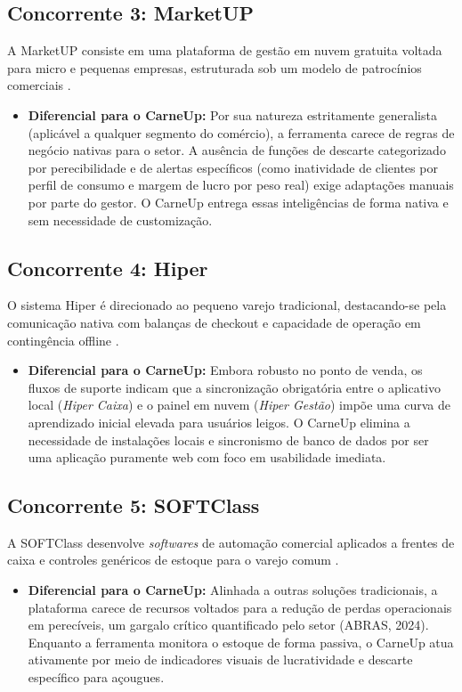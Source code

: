 \documentclass[
	12pt,				%
	openany,			%
	oneside,			%
	a4paper,			%
	english,			%
	french,				%
	spanish,			%
	brazil				%
	]{abntex2}
\begin{document}
\subsection{Concorrente 3: MarketUP}
A MarketUP consiste em uma plataforma de gestão em nuvem gratuita voltada para micro e pequenas empresas, estruturada sob um modelo de patrocínios comerciais \cite{marketUp}.
\begin{itemize}
    \item \textbf{Diferencial para o CarneUp:} Por sua natureza estritamente generalista (aplicável a qualquer segmento do comércio), a ferramenta carece de regras de negócio nativas para o setor. A ausência de funções de descarte categorizado por perecibilidade e de alertas específicos (como inatividade de clientes por perfil de consumo e margem de lucro por peso real) exige adaptações manuais por parte do gestor. O CarneUp entrega essas inteligências de forma nativa e sem necessidade de customização.
\end{itemize}

\subsection{Concorrente 4: Hiper}
O sistema Hiper é direcionado ao pequeno varejo tradicional, destacando-se pela comunicação nativa com balanças de checkout e capacidade de operação em contingência offline \cite{hiper}.
\begin{itemize}
    \item \textbf{Diferencial para o CarneUp:} Embora robusto no ponto de venda, os fluxos de suporte indicam que a sincronização obrigatória entre o aplicativo local (\textit{Hiper Caixa}) e o painel em nuvem (\textit{Hiper Gestão}) impõe uma curva de aprendizado inicial elevada para usuários leigos. O CarneUp elimina a necessidade de instalações locais e sincronismo de banco de dados por ser uma aplicação puramente web com foco em usabilidade imediata.
\end{itemize}

\subsection{Concorrente 5: SOFTClass}
A SOFTClass desenvolve \textit{softwares} de automação comercial aplicados a frentes de caixa e controles genéricos de estoque para o varejo comum \cite{softclass}.
\begin{itemize}
    \item \textbf{Diferencial para o CarneUp:} Alinhada a outras soluções tradicionais, a plataforma carece de recursos voltados para a redução de perdas operacionais em perecíveis, um gargalo crítico quantificado pelo setor (ABRAS, 2024). Enquanto a ferramenta monitora o estoque de forma passiva, o CarneUp atua ativamente por meio de indicadores visuais de lucratividade e descarte específico para açougues.
\end{itemize}
\end{document}
